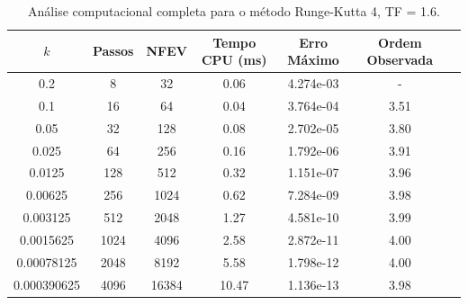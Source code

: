 \begin{table}[H]
    \centering
    \begin{tabular}{ccccccc}
        \hline
        $k$ & Passos & NFEV & Tempo CPU (ms) & Erro Máximo & Ordem Observada \\
        \hline
        0.2 & 8 & 32 & 0.06  & 4.274e-03 & - \\
        0.1 & 16 & 64 & 0.04  & 3.764e-04 & 3.51 \\
        0.05 & 32 & 128 & 0.08  & 2.702e-05 & 3.80 \\
        0.025 & 64 & 256 & 0.16  & 1.792e-06 & 3.91 \\
        0.0125 & 128 & 512 & 0.32  & 1.151e-07 & 3.96 \\
        0.00625 & 256 & 1024 & 0.62  & 7.284e-09 & 3.98 \\
        0.003125 & 512 & 2048 & 1.27  & 4.581e-10 & 3.99 \\
        0.0015625 & 1024 & 4096 & 2.58  & 2.872e-11 & 4.00 \\
        0.00078125 & 2048 & 8192 & 5.58  & 1.798e-12 & 4.00 \\
        0.000390625 & 4096 & 16384 & 10.47  & 1.136e-13 & 3.98 \\
        \hline
    \end{tabular}
    \caption{Análise computacional completa para o método Runge-Kutta 4, TF = 1.6.}
    \label{tab:erros_runge-kutta_4,_tf_=_1.6}
\end{table}

